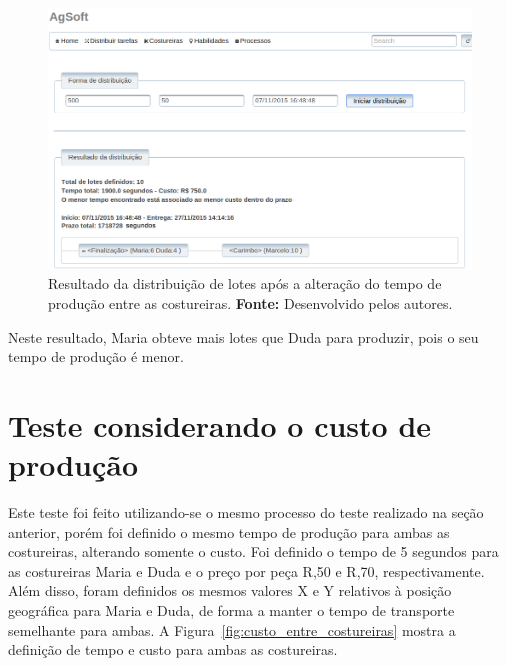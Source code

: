 \begin{figure}[h!]
	\centerline{\includegraphics[width=14.7cm]{./imagens/novo_resultado_alterado_tempo_teste1.png}}
	\caption[Resultado da distribuição de lotes após a alteração do tempo de
	produção entre as costureiras.]
	{Resultado da distribuição de lotes após a alteração do tempo de
	produção entre as costureiras. \textbf{Fonte:} Desenvolvido pelos autores.}
	\label{fig:novo_resultado_distribuicao_teste1}
\end{figure}

\par Neste resultado, Maria obteve mais lotes que Duda para produzir, pois o seu
tempo de produção é menor.

\section{Teste considerando o custo de produção}

\par Este teste foi feito utilizando-se o mesmo processo do teste realizado na seção anterior,
porém foi definido o mesmo tempo de produção para ambas as costureiras,
alterando somente o custo. Foi definido o tempo de 5 segundos para as costureiras Maria e Duda e o preço por peça R,50 e R,70, respectivamente. Além disso, foram definidos os mesmos valores X e Y
relativos à posição geográfica para Maria e Duda, de forma a manter o tempo de
transporte semelhante para ambas.
A Figura~\ref{fig:custo_entre_costureiras} mostra a definição de tempo e custo
para ambas as costureiras.

